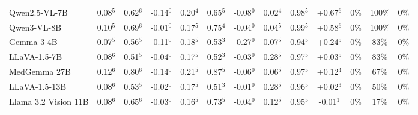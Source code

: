 \begin{table}[pos=t]
{\begin{tabular}{l@{\hspace{7pt}}ccc@{\hspace{4pt}}ccc@{\hspace{4pt}}ccc@{\hspace{4pt}}ccc}
Qwen2.5-VL-7B & \cellcolor{cfSage2}0.08$^{5}$ & \cellcolor{cfSage2}0.62$^{6}$ & \cellcolor{cfSlate3}-0.14$^{0}$ & \cellcolor{cfSage3}0.20$^{4}$ & \cellcolor{cfSage2}0.65$^{5}$ & \cellcolor{cfSlate2}-0.08$^{0}$ & \cellcolor{cfSage1}0.02$^{4}$ & \cellcolor{cfSage4}0.98$^{5}$ & \cellcolor{cfTerra4}+0.67$^{6}$ & \cellcolor{cfTerra1}0\% & \cellcolor{cfTerra4}100\% & 0\% \\
Qwen3-VL-8B & \cellcolor{cfSage2}0.10$^{5}$ & \cellcolor{cfSage2}0.69$^{6}$ & \cellcolor{cfSlate1}-0.01$^{0}$ & \cellcolor{cfSage3}0.17$^{5}$ & \cellcolor{cfSage2}0.75$^{4}$ & \cellcolor{cfSlate2}-0.04$^{0}$ & \cellcolor{cfSage1}0.04$^{5}$ & \cellcolor{cfSage4}0.99$^{5}$ & \cellcolor{cfTerra4}+0.58$^{6}$ & \cellcolor{cfTerra1}0\% & \cellcolor{cfTerra4}100\% & 0\% \\
Gemma 3 4B & \cellcolor{cfSage2}0.07$^{5}$ & \cellcolor{cfSage1}0.56$^{5}$ & \cellcolor{cfSlate3}-0.11$^{0}$ & \cellcolor{cfSage3}0.18$^{5}$ & \cellcolor{cfSage1}0.53$^{3}$ & \cellcolor{cfSlate4}-0.27$^{0}$ & \cellcolor{cfSage2}0.07$^{5}$ & \cellcolor{cfSage4}0.94$^{5}$ & \cellcolor{cfTerra3}+0.24$^{5}$ & \cellcolor{cfTerra1}0\% & \cellcolor{cfTerra3}83\% & 0\% \\
LLaVA-1.5-7B & \cellcolor{cfSage2}0.08$^{6}$ & \cellcolor{cfSage1}0.51$^{5}$ & \cellcolor{cfSlate2}-0.04$^{0}$ & \cellcolor{cfSage3}0.17$^{5}$ & \cellcolor{cfSage1}0.52$^{3}$ & \cellcolor{cfSlate2}-0.03$^{0}$ & \cellcolor{cfSage4}0.28$^{5}$ & \cellcolor{cfSage4}0.97$^{5}$ & \cellcolor{cfTerra2}+0.03$^{5}$ & \cellcolor{cfTerra1}0\% & \cellcolor{cfTerra3}83\% & 0\% \\
MedGemma 27B & \cellcolor{cfSage3}0.12$^{6}$ & \cellcolor{cfSage3}0.80$^{6}$ & \cellcolor{cfSlate3}-0.14$^{0}$ & \cellcolor{cfSage4}0.21$^{5}$ & \cellcolor{cfSage3}0.87$^{5}$ & \cellcolor{cfSlate2}-0.06$^{0}$ & \cellcolor{cfSage2}0.06$^{5}$ & \cellcolor{cfSage4}0.97$^{5}$ & \cellcolor{cfTerra3}+0.12$^{4}$ & \cellcolor{cfTerra1}0\% & \cellcolor{cfTerra3}67\% & 0\% \\
LLaVA-1.5-13B & \cellcolor{cfSage2}0.08$^{6}$ & \cellcolor{cfSage1}0.53$^{5}$ & \cellcolor{cfSlate2}-0.02$^{0}$ & \cellcolor{cfSage3}0.17$^{5}$ & \cellcolor{cfSage1}0.51$^{3}$ & \cellcolor{cfSlate1}-0.01$^{0}$ & \cellcolor{cfSage4}0.28$^{5}$ & \cellcolor{cfSage4}0.96$^{5}$ & \cellcolor{cfTerra2}+0.02$^{3}$ & \cellcolor{cfTerra1}0\% & \cellcolor{cfTerra3}50\% & 0\% \\
Llama 3.2 Vision 11B & \cellcolor{cfSage2}0.08$^{6}$ & \cellcolor{cfSage2}0.65$^{6}$ & \cellcolor{cfSlate2}-0.03$^{0}$ & \cellcolor{cfSage3}0.16$^{5}$ & \cellcolor{cfSage2}0.73$^{5}$ & \cellcolor{cfSlate2}-0.04$^{0}$ & \cellcolor{cfSage3}0.12$^{5}$ & \cellcolor{cfSage4}0.95$^{5}$ & \cellcolor{cfSlate1}-0.01$^{1}$ & \cellcolor{cfTerra1}0\% & \cellcolor{cfTerra2}17\% & 0\% \\

\end{tabular}}
\end{table}
